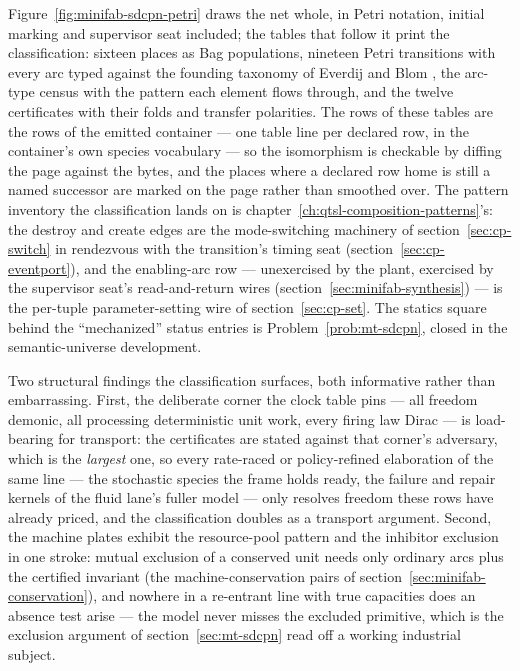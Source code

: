 Figure~\ref{fig:minifab-sdcpn-petri} draws the net whole, in Petri
notation, initial marking and supervisor seat included; the tables
that follow it print the classification: sixteen places as Bag
populations, nineteen Petri transitions with every arc typed against
the founding taxonomy of Everdij and Blom \cite{everdij-blom-2010},
the arc-type census with the pattern each element flows through, and
the twelve certificates with their folds and transfer polarities.
The rows of these tables are the rows of the emitted container ---
one table line per declared row, in the container's own species
vocabulary --- so the isomorphism is checkable by diffing the page
against the bytes, and the places where a declared row home is
still a named successor are marked on the page rather than smoothed
over. The pattern inventory the classification lands on is
chapter~\ref{ch:qtsl-composition-patterns}'s: the destroy and
create edges are the mode-switching machinery of
section~\ref{sec:cp-switch} in rendezvous with the transition's
timing seat (section~\ref{sec:cp-eventport}), and the enabling-arc
row --- unexercised by the plant, exercised by the supervisor
seat's read-and-return wires
(section~\ref{sec:minifab-synthesis}) --- is the per-tuple
parameter-setting wire of section~\ref{sec:cp-set}. The statics
square behind the ``mechanized'' status entries is
Problem~\ref{prob:mt-sdcpn}, closed in the semantic-universe
development.





Two structural findings the classification surfaces, both
informative rather than embarrassing. First, the deliberate corner
the clock table pins --- all freedom demonic, all processing
deterministic unit work, every firing law Dirac --- is load-bearing
for transport: the certificates are stated against that corner's
adversary, which is the \emph{largest} one, so every rate-raced or
policy-refined elaboration of the same line --- the stochastic
species the frame holds ready, the failure and repair kernels of
the fluid lane's fuller model --- only resolves freedom these rows
have already priced, and the classification doubles as a transport
argument. Second, the machine plates exhibit the resource-pool
pattern and the inhibitor exclusion in one stroke: mutual exclusion
of a conserved unit needs only ordinary arcs plus the certified
invariant (the machine-conservation pairs of
section~\ref{sec:minifab-conservation}), and nowhere in a
re-entrant line with true capacities does an absence test arise ---
the model never misses the excluded primitive, which is the
exclusion argument of section~\ref{sec:mt-sdcpn} read off a working
industrial subject.

